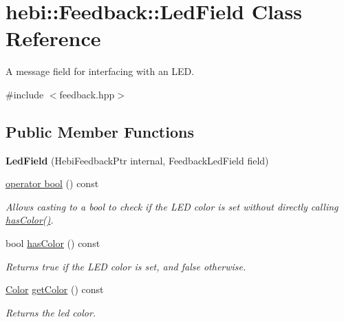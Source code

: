 \hypertarget{classhebi_1_1Feedback_1_1LedField}{}\section{hebi\+:\+:Feedback\+:\+:Led\+Field Class Reference}
\label{classhebi_1_1Feedback_1_1LedField}


A message field for interfacing with an L\+ED.  




{\ttfamily \#include $<$feedback.\+hpp$>$}

\subsection*{Public Member Functions}
\begin{DoxyCompactItemize}
\item 
\mbox{\label{classhebi_1_1Feedback_1_1LedField_a3bb6871c57c7eb4b00d15ad001ec1fb0}} 
{\bfseries Led\+Field} (Hebi\+Feedback\+Ptr internal, Feedback\+Led\+Field field)
\item 
\hyperlink{classhebi_1_1Feedback_1_1LedField_ae258cf9c06ca97d9619ab5e108ce2298}{operator bool} () const
\begin{DoxyCompactList}\small\item\em Allows casting to a bool to check if the L\+ED color is set without directly calling {\ttfamily \hyperlink{classhebi_1_1Feedback_1_1LedField_a6a224e138119ac5c9be96617cf8acffe}{has\+Color()}}. \end{DoxyCompactList}\item 
\mbox{\label{classhebi_1_1Feedback_1_1LedField_a6a224e138119ac5c9be96617cf8acffe}} 
bool \hyperlink{classhebi_1_1Feedback_1_1LedField_a6a224e138119ac5c9be96617cf8acffe}{has\+Color} () const
\begin{DoxyCompactList}\small\item\em Returns true if the L\+ED color is set, and false otherwise. \end{DoxyCompactList}\item 
\mbox{\label{classhebi_1_1Feedback_1_1LedField_abae72ae83941984a03547fe9c512bea7}} 
\hyperlink{structhebi_1_1Color}{Color} \hyperlink{classhebi_1_1Feedback_1_1LedField_abae72ae83941984a03547fe9c512bea7}{get\+Color} () const
\begin{DoxyCompactList}\small\item\em Returns the led color. \end{DoxyCompactList}\end{DoxyCompactItemize}


